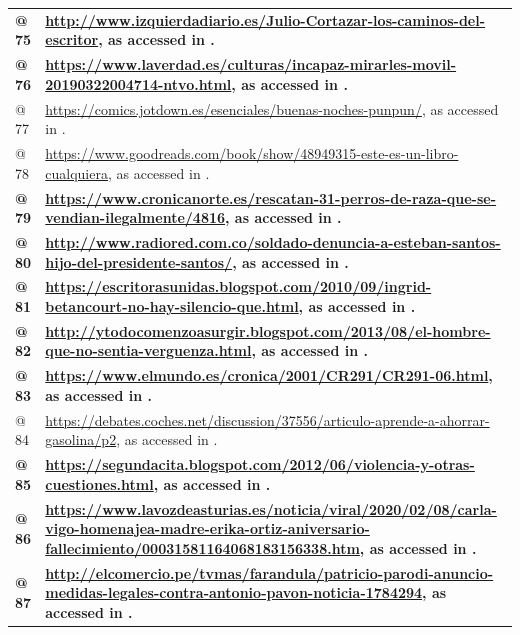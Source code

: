\documentclass[output=paper]{langscibook}
\begin{document}
\begin{tabularx}{\textwidth}{XX}
{\bfseries \textmd{@ 75} } & {\bfseries \url{http://www.izquierdadiario.es/Julio-Cortazar-los-caminos-del-escritor}\textmd{, as accessed in \citealt{June2021}.}}\\
{\bfseries \textmd{@ 76} } & {\bfseries \url{https://www.laverdad.es/culturas/incapaz-mirarles-movil-20190322004714-ntvo.html}\textmd{, as accessed in \citealt{June2021}.}}\\
@ 77 & \url{https://comics.jotdown.es/esenciales/buenas-noches-punpun/}, as accessed in \citealt{June2021}.\\
@ 78 & \url{https://www.goodreads.com/book/show/48949315-este-es-un-libro-cualquiera}, as accessed in \citealt{June2021}.\\
{\bfseries \textmd{@ 79} } & {\bfseries \url{https://www.cronicanorte.es/rescatan-31-perros-de-raza-que-se-vendian-ilegalmente/4816}\textmd{, as accessed in \citealt{December2020}.}}\\
{\bfseries \textmd{@ 80} } & {\bfseries \url{http://www.radiored.com.co/soldado-denuncia-a-esteban-santos-hijo-del-presidente-santos/}\textmd{, as accessed in \citealt{March2017}.}}\\
{\bfseries \textmd{@ 81} } & {\bfseries \url{https://escritorasunidas.blogspot.com/2010/09/ingrid-betancourt-no-hay-silencio-que.html}\textmd{, as accessed in \citealt{December2020}.}}\\
{\bfseries \textmd{@ 82} } & {\bfseries \url{http://ytodocomenzoasurgir.blogspot.com/2013/08/el-hombre-que-no-sentia-verguenza.html}\textmd{, as accessed in \citealt{December2020}.}}\\
{\bfseries \textmd{@ 83} } & {\bfseries \url{https://www.elmundo.es/cronica/2001/CR291/CR291-06.html}\textmd{, as accessed in \citealt{December2020}.}}\\
@ 84 & \url{https://debates.coches.net/discussion/37556/articulo-aprende-a-ahorrar-gasolina/p2}, as accessed in \citealt{June2021}.\\
{\bfseries \textmd{@ 85} } & {\bfseries \url{https://segundacita.blogspot.com/2012/06/violencia-y-otras-cuestiones.html}\textmd{, as accessed in \citealt{December2020}.}}\\
{\bfseries \textmd{@ 86} } & {\bfseries \url{https://www.lavozdeasturias.es/noticia/viral/2020/02/08/carla-vigo-homenajea-madre-erika-ortiz-aniversario-fallecimiento/00031581164068183156338.htm}\textmd{, as accessed in \citealt{June2021}.}}\\
{\bfseries \textmd{@ 87} } & {\bfseries \url{http://elcomercio.pe/tvmas/farandula/patricio-parodi-anuncio-medidas-legales-contra-antonio-pavon-noticia-1784294}\textmd{, as accessed in \citealt{March2017}.}}\\

\end{tabularx}
\end{document}
